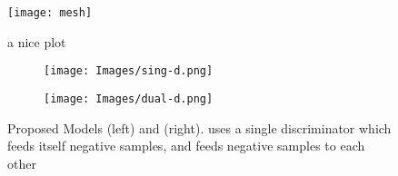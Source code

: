 
\begin{figure}[h]
    \centering
    \texttt{[image: mesh]}
    \caption{a nice plot}
    \label{fig:mesh1}
\end{figure}



\usepackage{graphicx}
\usepackage{subcaption}

\begin{figure}[h]
\begin{subfigure}{.45\textwidth}
  \centering
  \texttt{[image: Images/sing-d.png]}
\end{subfigure}\hfill
\begin{subfigure}{.45\textwidth}
  \centering
  \texttt{[image: Images/dual-d.png]}
\end{subfigure}
\caption{Proposed Models \singd{} (left) and \duald{} (right). \textit{\singd{}} uses a single discriminator which feeds itself negative samples, and \textit{\duald{}} feeds negative samples to each other}
\label{fig:models}
\end{figure}
